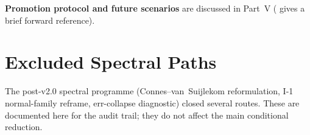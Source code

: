 \documentclass[12pt,a4paper]{article}
\theoremstyle{definition}
\theoremstyle{remark}
\begin{document}
\noindent\textbf{Promotion protocol and future scenarios} are discussed
in Part~V ( gives a brief forward reference).


\section{Excluded Spectral Paths}
\label{sec:excluded-spectral}

The post-v2.0 spectral programme (Connes--van~Suijlekom reformulation,
I-1 normal-family reframe, err-collapse diagnostic) closed several
routes. These are documented here for the audit trail; they do not affect
the main conditional reduction.
\end{document}
